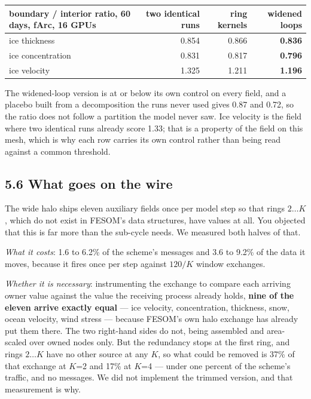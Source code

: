 \documentclass[11pt,a4paper]{article}
\begin{document}
\begin{center}\small
\begin{tabular}{@{}lrrr@{}}
\toprule
boundary / interior ratio, 60 days, fArc, 16 GPUs & two identical runs & ring kernels & \textbf{widened loops} \\
\midrule
ice thickness     & 0.854 & 0.866 & \textbf{0.836} \\
ice concentration & 0.831 & 0.817 & \textbf{0.796} \\
ice velocity      & 1.325 & 1.211 & \textbf{1.196} \\
\bottomrule
\end{tabular}
\end{center}

The widened-loop version is at or below its own control on every field, and a placebo built from a
decomposition the runs never used gives 0.87 and 0.72, so the ratio does not follow a partition the
model never saw. Ice velocity is the field where two identical runs already score 1.33; that is a
property of the field on this mesh, which is why each row carries its own control rather than being
read against a common threshold.

\subsection*{5.6 What goes on the wire}

The wide halo ships eleven auxiliary fields once per model step so that rings $2\ldots K$, which do
not exist in FESOM's data structures, have values at all. You objected that this is far more than
the sub-cycle needs. We measured both halves of that.

\emph{What it costs}: 1.6 to 6.2\% of the scheme's messages and 3.6 to 9.2\% of the data it moves,
because it fires once per step against $120/K$ window exchanges.

\emph{Whether it is necessary}: instrumenting the exchange to compare each arriving owner value
against the value the receiving process already holds, \textbf{nine of the eleven arrive exactly
equal} --- ice velocity, concentration, thickness, snow, ocean velocity, wind stress --- because
FESOM's own halo exchange has already put them there. The two right-hand sides do not, being
assembled and area-scaled over owned nodes only. But the redundancy stops at the first ring, and
rings $2\ldots K$ have no other source at any $K$, so what could be removed is 37\% of that
exchange at $K$=2 and 17\% at $K$=4 --- under one percent of the scheme's traffic, and no messages.
We did not implement the trimmed version, and that measurement is why.
\end{document}
